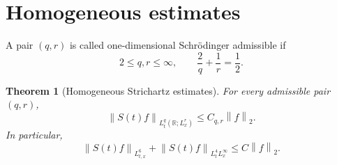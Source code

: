 \documentclass[11pt,oneside]{book}
\newtheorem{theorem}{Theorem}[chapter]
\theoremstyle{definition}
\theoremstyle{remark}
\newcommand{\R}{\mathbb R}
\newcommand{\1}{\mathbf 1}
\newcommand{\norm}[1]{\left\lVert #1\right\rVert}
\begin{document}
\section{Homogeneous estimates}
A pair $(q,r)$ is called one-dimensional Schr\"odinger admissible if
\begin{equation}
  2\le q,r\le\infty,
  \qquad \frac2q+\frac1r=\frac12.                 \label{eq:admissible}
\end{equation}

\begin{theorem}[Homogeneous Strichartz estimates]\label{thm:hom-strichartz}
For every admissible pair $(q,r)$,
\begin{equation}
  \norm{S(t)f}_{L^q_t(\R;L^r_x)}\le C_{q,r}\norm f_2. \label{eq:hom-str}
\end{equation}
In particular,
\[
 \norm{S(t)f}_{L^6_{t,x}}+\norm{S(t)f}_{L^4_tL^\infty_x}
 \le C\norm f_2.
\]
\end{theorem}
\end{document}
